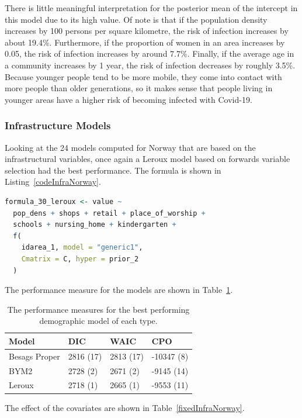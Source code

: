 There is little meaningful interpretation for the posterior mean of the intercept in this model due to its high value. Of note is that if the population density increases by 100 persons per square kilometre, the risk of infection increases by about 19.4\%. Furthermore, if the proportion of women in an area increases by 0.05, the risk of infection increases by around 7.7\%. Finally, if the average age in a community increases by 1 year, the risk of infection decreases by roughly 3.5\%. Because younger people tend to be more mobile, they come into contact with more people than older generations, so it makes sense that people living in younger areas have a higher risk of becoming infected with Covid-19.
\subsubsection{Infrastructure Models}
Looking at the 24 models computed for Norway that are based on the infrastructural variables, once again a Leroux model based on forwards variable selection had the best performance. The formula is shown in Listing~\ref{codeInfraNorway}.
\begin{lstlisting}[caption={The formula for the best Leroux model based on the infrastructural variables}, label={codeInfraNorway}, language = R]
formula_30_leroux <- value ~
  pop_dens + shops + retail + place_of_worship +
  schools + nursing_home + kindergarten +
  f(
    idarea_1, model = "generic1",
    Cmatrix = C, hyper = prior_2
  )
\end{lstlisting}
The performance measure for the models are shown in Table~\ref{infraNorway}.
\begin{table}[H] 
\caption{The performance measures for the best performing demographic model of each type. \label{infraNorway}}
\begin{tabular}{l l l l}
\toprule
\textbf{Model}	& \textbf{DIC}	& \textbf{WAIC} & \textbf{CPO} \\
\midrule
Besags Proper  & 2816 (17) & 2813 (17) & -10347 (8) \\
BYM2 & 2728 (2) & 2671 (2) & -9145 (14)\\
Leroux & 2718 (1) & 2665 (1) & -9553 (11) \\
\bottomrule
\end{tabular}
\end{table}
The effect of the covariates are shown in Table~\ref{fixedInfraNorway}.

